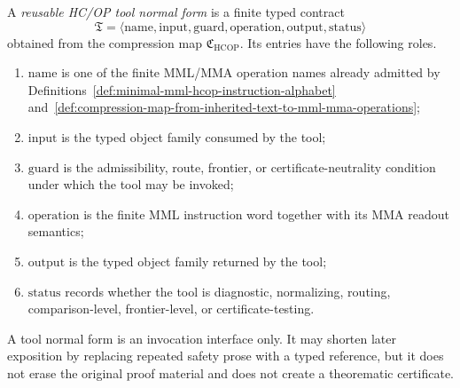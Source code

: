 \begin{definition}
\label{def:first-reusable-hcop-tool-normal-form}
A \emph{reusable HC/OP tool normal form} is a finite typed contract
\[
  \mathfrak T
  =
  \langle
    \mathrm{name},
    \mathrm{input},
    \mathrm{guard},
    \mathrm{operation},
    \mathrm{output},
    \mathrm{status}
  \rangle
\]
obtained from the compression map \(\mathfrak C_{\mathrm{HCOP}}\). Its entries have the following roles.
\begin{enumerate}[leftmargin=2em,label=(\roman*)]
  \item \(\mathrm{name}\) is one of the finite MML/MMA operation names already admitted by Definitions~\ref{def:minimal-mml-hcop-instruction-alphabet} and~\ref{def:compression-map-from-inherited-text-to-mml-mma-operations};
  \item \(\mathrm{input}\) is the typed object family consumed by the tool;
  \item \(\mathrm{guard}\) is the admissibility, route, frontier, or certificate-neutrality condition under which the tool may be invoked;
  \item \(\mathrm{operation}\) is the finite MML instruction word together with its MMA readout semantics;
  \item \(\mathrm{output}\) is the typed object family returned by the tool;
  \item \(\mathrm{status}\) records whether the tool is diagnostic, normalizing, routing, comparison-level, frontier-level, or certificate-testing.
\end{enumerate}
A tool normal form is an invocation interface only. It may shorten later exposition by replacing repeated safety prose with a typed reference, but it does not erase the original proof material and does not create a theorematic certificate.
\end{definition}

